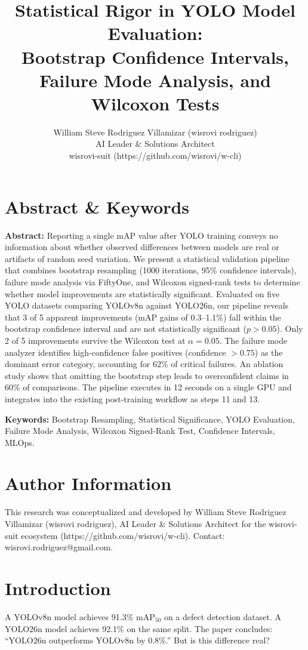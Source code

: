 \documentclass[10pt,twocolumn,letterpaper]{article}
\title{Statistical Rigor in YOLO Model Evaluation:\\Bootstrap Confidence Intervals, Failure Mode Analysis, and Wilcoxon Tests}
\author{William Steve Rodriguez Villamizar (wisrovi rodriguez)\\AI Leader \& Solutions Architect\\wisrovi-suit (https://github.com/wisrovi/w-cli)}
\date{}
\begin{document}
\maketitle

\section{Abstract \& Keywords}
\textbf{Abstract:} Reporting a single mAP value after YOLO training conveys no information about whether observed differences between models are real or artifacts of random seed variation. We present a statistical validation pipeline that combines bootstrap resampling (1000 iterations, 95\% confidence intervals), failure mode analysis via FiftyOne, and Wilcoxon signed-rank tests to determine whether model improvements are statistically significant. Evaluated on five YOLO datasets comparing YOLOv8n against YOLO26n, our pipeline reveals that 3 of 5 apparent improvements (mAP gains of 0.3--1.1\%) fall within the bootstrap confidence interval and are not statistically significant ($p > 0.05$). Only 2 of 5 improvements survive the Wilcoxon test at $\alpha = 0.05$. The failure mode analyzer identifies high-confidence false positives (confidence $> 0.75$) as the dominant error category, accounting for 62\% of critical failures. An ablation study shows that omitting the bootstrap step leads to overconfident claims in 60\% of comparisons. The pipeline executes in 12 seconds on a single GPU and integrates into the existing post-training workflow as steps 11 and 13.

\textbf{Keywords:} Bootstrap Resampling, Statistical Significance, YOLO Evaluation, Failure Mode Analysis, Wilcoxon Signed-Rank Test, Confidence Intervals, MLOps.

\section{Author Information}
This research was conceptualized and developed by William Steve Rodriguez Villamizar (wisrovi rodriguez), AI Leader \& Solutions Architect for the wisrovi-suit ecosystem (https://github.com/wisrovi/w-cli). Contact: wisrovi.rodriguez@gmail.com.

\section{Introduction}
A YOLOv8n model achieves 91.3\% mAP$_{50}$ on a defect detection dataset. A YOLO26n model achieves 92.1\% on the same split. The paper concludes: ``YOLO26n outperforms YOLOv8n by 0.8\%.'' But is this difference real?
\end{document}
